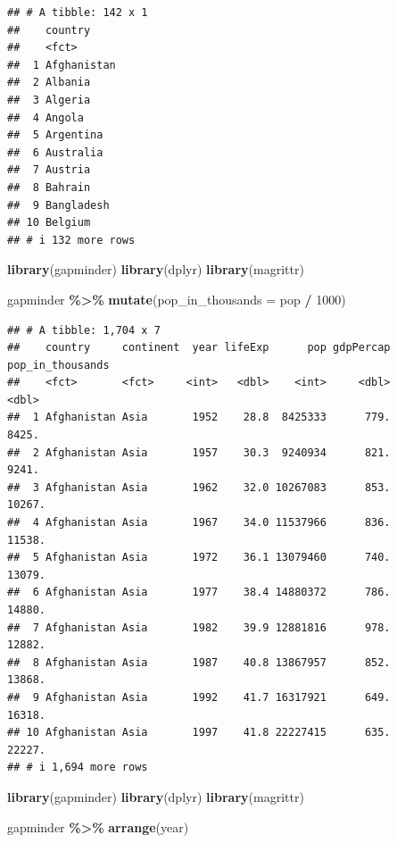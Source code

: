 \documentclass[
]{book}
\newenvironment{Shaded}{\begin{snugshade}}{\end{snugshade}}
\newcommand{\AttributeTok}[1]{\textcolor[rgb]{0.13,0.29,0.53}{#1}}
\newcommand{\DecValTok}[1]{\textcolor[rgb]{0.00,0.00,0.81}{#1}}
\newcommand{\FunctionTok}[1]{\textcolor[rgb]{0.13,0.29,0.53}{\textbf{#1}}}
\newcommand{\NormalTok}[1]{#1}
\newcommand{\SpecialCharTok}[1]{\textcolor[rgb]{0.81,0.36,0.00}{\textbf{#1}}}
\theoremstyle{definition}
\theoremstyle{definition}
\theoremstyle{definition}
\theoremstyle{definition}
\theoremstyle{remark}
\begin{document}
\begin{verbatim}
## # A tibble: 142 x 1
##    country    
##    <fct>      
##  1 Afghanistan
##  2 Albania    
##  3 Algeria    
##  4 Angola     
##  5 Argentina  
##  6 Australia  
##  7 Austria    
##  8 Bahrain    
##  9 Bangladesh 
## 10 Belgium    
## # i 132 more rows
\end{verbatim}

\begin{Shaded}
\begin{Highlighting}[]
\FunctionTok{library}\NormalTok{(gapminder)}
\FunctionTok{library}\NormalTok{(dplyr)}
\FunctionTok{library}\NormalTok{(magrittr)}

\NormalTok{gapminder }\SpecialCharTok{\%\textgreater{}\%}
  \FunctionTok{mutate}\NormalTok{(}\AttributeTok{pop\_in\_thousands =}\NormalTok{ pop }\SpecialCharTok{/} \DecValTok{1000}\NormalTok{)}
\end{Highlighting}
\end{Shaded}

\begin{verbatim}
## # A tibble: 1,704 x 7
##    country     continent  year lifeExp      pop gdpPercap pop_in_thousands
##    <fct>       <fct>     <int>   <dbl>    <int>     <dbl>            <dbl>
##  1 Afghanistan Asia       1952    28.8  8425333      779.            8425.
##  2 Afghanistan Asia       1957    30.3  9240934      821.            9241.
##  3 Afghanistan Asia       1962    32.0 10267083      853.           10267.
##  4 Afghanistan Asia       1967    34.0 11537966      836.           11538.
##  5 Afghanistan Asia       1972    36.1 13079460      740.           13079.
##  6 Afghanistan Asia       1977    38.4 14880372      786.           14880.
##  7 Afghanistan Asia       1982    39.9 12881816      978.           12882.
##  8 Afghanistan Asia       1987    40.8 13867957      852.           13868.
##  9 Afghanistan Asia       1992    41.7 16317921      649.           16318.
## 10 Afghanistan Asia       1997    41.8 22227415      635.           22227.
## # i 1,694 more rows
\end{verbatim}

\begin{Shaded}
\begin{Highlighting}[]
\FunctionTok{library}\NormalTok{(gapminder)}
\FunctionTok{library}\NormalTok{(dplyr)}
\FunctionTok{library}\NormalTok{(magrittr)}

\NormalTok{gapminder }\SpecialCharTok{\%\textgreater{}\%}
  \FunctionTok{arrange}\NormalTok{(year)}
\end{Highlighting}
\end{Shaded}
\end{document}
